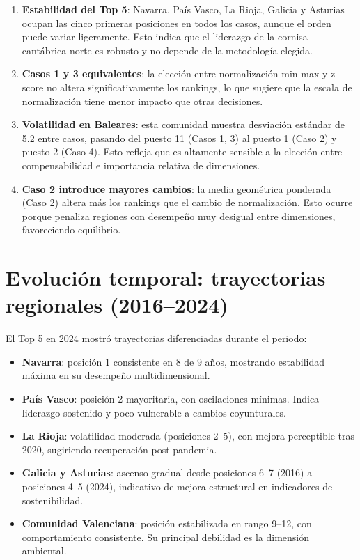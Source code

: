 \begin{enumerate}
    \item \textbf{Estabilidad del Top 5}: Navarra, País Vasco, La Rioja, Galicia y Asturias ocupan las cinco primeras posiciones en todos los casos, aunque el orden puede variar ligeramente. Esto indica que el liderazgo de la cornisa cantábrica-norte es robusto y no depende de la metodología elegida.
    
    \item \textbf{Casos 1 y 3 equivalentes}: la elección entre normalización min-max y z-score no altera significativamente los rankings, lo que sugiere que la escala de normalización tiene menor impacto que otras decisiones.
    
    \item \textbf{Volatilidad en Baleares}: esta comunidad muestra desviación estándar de 5.2 entre casos, pasando del puesto 11 (Casos 1, 3) al puesto 1 (Caso 2) y puesto 2 (Caso 4). Esto refleja que es altamente sensible a la elección entre compensabilidad e importancia relativa de dimensiones.
    
    \item \textbf{Caso 2 introduce mayores cambios}: la media geométrica ponderada (Caso 2) altera más los rankings que el cambio de normalización. Esto ocurre porque penaliza regiones con desempeño muy desigual entre dimensiones, favoreciendo equilibrio.
\end{enumerate}

\section{Evolución temporal: trayectorias regionales (2016--2024)}

El Top 5 en 2024 mostró trayectorias diferenciadas durante el periodo:

\begin{itemize}
    \item \textbf{Navarra}: posición 1 consistente en 8 de 9 años, mostrando estabilidad máxima en su desempeño multidimensional.
    
    \item \textbf{País Vasco}: posición 2 mayoritaria, con oscilaciones mínimas. Indica liderazgo sostenido y poco vulnerable a cambios coyunturales.
    
    \item \textbf{La Rioja}: volatilidad moderada (posiciones 2--5), con mejora perceptible tras 2020, sugiriendo recuperación post-pandemia.
    
    \item \textbf{Galicia y Asturias}: ascenso gradual desde posiciones 6--7 (2016) a posiciones 4--5 (2024), indicativo de mejora estructural en indicadores de sostenibilidad.
    
    \item \textbf{Comunidad Valenciana}: posición estabilizada en rango 9--12, con comportamiento consistente. Su principal debilidad es la dimensión ambiental.
\end{itemize}

